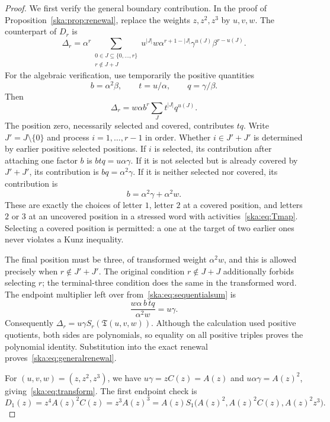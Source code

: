 \documentclass[11pt,letterpaper]{article}
\theoremstyle{definition}
\begin{document}
\begin{proof}
We first verify the general boundary contribution. In the proof of Proposition~\ref{ska:prop:renewal}, replace the weights $z,z^2,z^3$ by $u,v,w$. The counterpart of $D_r$ is
\[
\Delta_r=\alpha^r
\sum_{\substack{0\in J\subseteq\{0,\ldots,r\}\\r\notin J+J}}
u^{|J|}w\alpha^{r+1-|J|}\gamma^{u(J)}\beta^{r-u(J)}.
\]
For the algebraic verification, use temporarily the positive quantities
\[
b=\alpha^2\beta,\qquad t=u/\alpha,\qquad q=\gamma/\beta.
\]
Then
\begin{equation}\label{ska:eq:sequentialsum}
\Delta_r=w\alpha b^r\sum_J t^{|J|}q^{u(J)}.
\end{equation}
The position zero, necessarily selected and covered, contributes $tq$. Write $J'=J\setminus\{0\}$ and process $i=1,\ldots,r-1$ in order. Whether $i\in J'+J'$ is determined by earlier positive selected positions. If $i$ is selected, its contribution after attaching one factor $b$ is $btq=u\alpha\gamma$. If it is not selected but is already covered by $J'+J'$, its contribution is $bq=\alpha^2\gamma$. If it is neither selected nor covered, its contribution is
\[
b=\alpha^2\gamma+\alpha^2w.
\]
These are exactly the choices of letter $1$, letter $2$ at a covered position, and letters $2$ or $3$ at an uncovered position in a stressed word with activities~\eqref{ska:eq:Tmap}. Selecting a covered position is permitted: a one at the target of two earlier ones never violates a Kunz inequality.

The final position must be three, of transformed weight $\alpha^2w$, and this is allowed precisely when $r\notin J'+J'$. The original condition $r\notin J+J$ additionally forbids selecting $r$; the terminal-three condition does the same in the transformed word. The endpoint multiplier left over from~\eqref{ska:eq:sequentialsum} is
\[
\frac{w\alpha\,b\,tq}{\alpha^2w}=u\gamma.
\]
Consequently $\Delta_r=u\gamma S_r(\mathfrak T(u,v,w))$. Although the calculation used positive quotients, both sides are polynomials, so equality on all positive triples proves the polynomial identity. Substitution into the exact renewal proves~\eqref{ska:eq:generalrenewal}.

For $(u,v,w)=(z,z^2,z^3)$, we have $u\gamma=zC(z)=A(z)$ and $u\alpha\gamma=A(z)^2$, giving~\eqref{ska:eq:transform}. The first endpoint check is
\[
D_1(z)=z^4A(z)^2C(z)=z^3A(z)^3
=A(z)S_1\bigl(A(z)^2,A(z)^2C(z),A(z)^2z^3\bigr).
\]
\end{proof}
\end{document}
